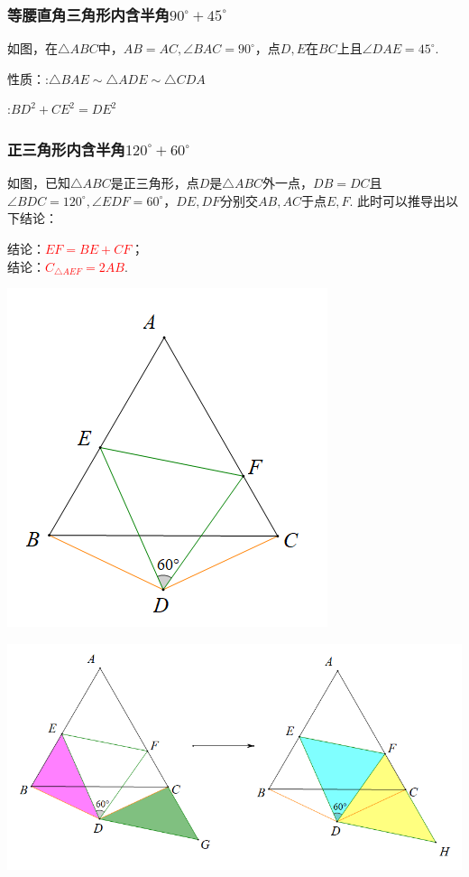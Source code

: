 \subsubsection{等腰直角三角形内含半角$90^\circ +45^\circ$}
如图，在$\triangle ABC$中，$AB=AC,\angle BAC=90^\circ$，点$D,E$在$BC$上且$\angle DAE=45^\circ$.

性质：:$\triangle BAE \sim \triangle ADE \sim \triangle CDA$

:$BD^2+CE^2=DE^2$




\subsubsection{正三角形内含半角$120^\circ +60^\circ$}
\begin{minipage}{0.6\textwidth}
	如图，已知$\triangle ABC$是正三角形，点$D$是$\triangle ABC$外一点，$DB=DC$且$\angle BDC=120^\circ,\angle EDF=60^\circ$，$DE,DF$分别交$AB,AC$于点$E,F$.
	此时可以推导出以下结论：
	
	结论：\textcolor{red}{$EF=BE+CF$}；\\
	结论：\textcolor{red}{$C_{\triangle AEF}=2AB$}.
\end{minipage}\qquad\qquad
\begin{minipage}{0.4\textwidth}
\includegraphics[scale=0.4]{figure/banjiao10.PNG}
\end{minipage}
\includegraphics[scale=0.4]{figure/banjiao11.PNG}

